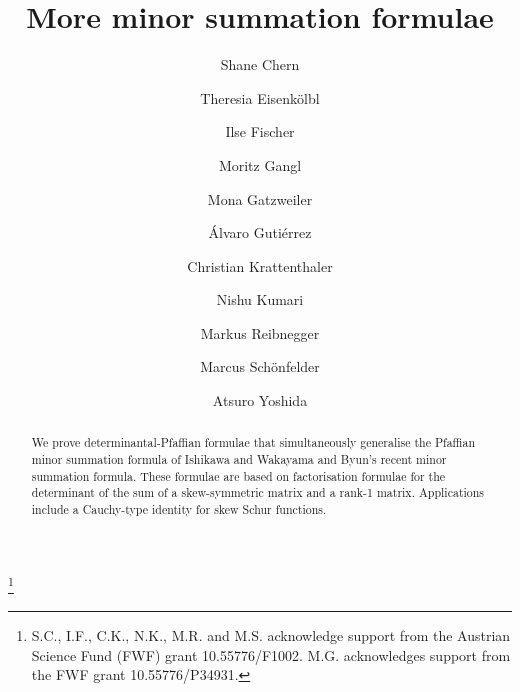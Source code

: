\documentclass[12pt,reqno]{amsart}
\numberwithin{equation}{section}
\theoremstyle{definition}
\theoremstyle{remark}
\begin{document}
\title{More minor summation formulae}

\author[Chern et al.]{Shane Chern}

\author[]{Theresia Eisenk\"olbl}

\author[]{Ilse Fischer}

\author[]{Moritz Gangl}

\author[]{Mona Gatzweiler}

\author[]{\'Alvaro Guti\'errez}

\author[]{Christian Krattenthaler}

\author[]{Nishu Kumari}

\author[]{Markus Reibnegger}

\author[]{Marcus Sch\"onfelder}

\author[]{Atsuro Yoshida}

\address{\noindent
S.C., T.E., I.F., M.G., M.G., C.K., N.K., M.R., M.S., A.Y.:\newline
Fakult\"at f\"ur Mathematik, Universit\"at Wien,
Oskar-Morgenstern-Platz~1, A-1090 Vienna, Austria.\newline
\rm
\url{https://shanechern.github.io}\newline
\url{http://www.mat.univie.ac.at/~teisenko}\newline
\url{http://www.mat.univie.ac.at/~ifischer}\newline
\url{https://homepage.univie.ac.at/moritz.gangl}\newline
\url{http://www.mat.univie.ac.at/~kratt}\newline
}

\address{A.G.: University of Bristol, Bristol, UK}

\thanks{S.C., I.F., C.K., N.K., M.R. and M.S. acknowledge support from the Austrian Science Fund (FWF) grant 10.55776/F1002.  M.G. acknowledges support from the FWF grant 10.55776/P34931.
}


\begin{abstract}
We prove determinantal-Pfaffian formulae that simultaneously
generalise the Pfaffian minor summation formula of Ishikawa and
Wakayama and Byun's recent minor summation formula. These formulae
are based on factorisation formulae for the determinant of the sum of
a skew-symmetric matrix and a rank-1 matrix. Applications include
a Cauchy-type identity for skew Schur functions.
\end{abstract}


\end{document}
